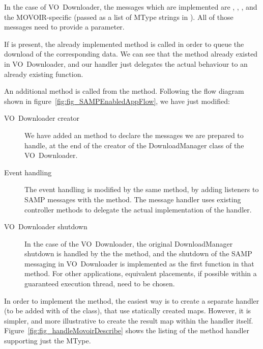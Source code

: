 			In the case of VO~Downloader, the messages which are
			implemented are ,
			, , and
			the MOVOIR-specific 
			(passed as a list of MType strings in
			). All of those messages need to
			provide a  parameter.
			
			 If  is present, the already implemented
			 method is called in order to queue the
			download of the corresponding data. We can see that the
			 method already existed in
			VO~Downloader, and our handler just delegates the actual
			behaviour to an already existing function.
			
			 An additional \shutdownSamp{} method is called
			from the  method. Following the
			flow diagram shown in
			figure~\ref{fig:fig_SAMPEnabledAppFlow}, we have just
			modified:
			
			\begin{description}
				\item[VO~Downloader creator] We have added an
				 method to declare the messages we
				are prepared to handle, at the end of the creator
				of the DownloadManager class of the VO~Downloader.
				
				 \item[Event handling] The event handling is
				modified by the same  method, by
				adding listeners to SAMP messages with the
				 method. The message
				handler uses existing controller methods to
				delegate the actual implementation of the handler.
				
				 \item[VO~Downloader shutdown] In the case of the
				VO~Downloader, the original DownloadManager shutdown
				is handled by the the  method,
				and the shutdown of the SAMP messaging in
				VO~Downloader is implemented as the first function
				in that method. For other applications, equivalent
				placements, if possible within a guaranteed
				execution thread, need to be chosen.
			\end{description}
			
			In order to implement the
			 method, the easiest way
			is to create a separate handler (to be added with
			 of the 
			class), that use statically created maps. However, it
			is simpler, and more illustrative to create the result
			map within the handler itself.
			Figure~\ref{fig:fig_handleMovoirDescribe} shows the
			listing of the  method
			handler supporting just the 
			MType.
			
